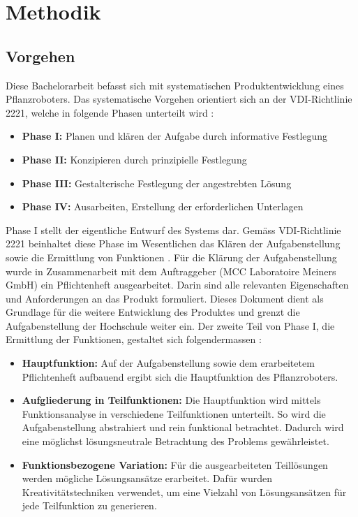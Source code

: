 \newpage
\section{Methodik}
\subsection{Vorgehen}
Diese Bachelorarbeit befasst sich mit systematischen Produktentwicklung eines Pflanzroboters. Das systematische Vorgehen orientiert sich  an der VDI-Richtlinie 2221, welche in folgende Phasen unterteilt wird \cite{naefe}:

\begin{itemize}
	\item \textbf{Phase I:} Planen und klären der Aufgabe durch informative Festlegung
	
	\item \textbf{Phase II:} Konzipieren durch prinzipielle Festlegung
	
	\item \textbf{Phase III:} Gestalterische Festlegung der angestrebten Lösung
	
	\item \textbf{Phase IV:} Ausarbeiten, Erstellung der erforderlichen Unterlagen
	
\end{itemize}

Phase I stellt der eigentliche Entwurf des Systems dar. Gemäss VDI-Richtlinie 2221 beinhaltet diese Phase im Wesentlichen das Klären der Aufgabenstellung sowie die Ermittlung von Funktionen \cite{vdi2221}. Für die Klärung der Aufgabenstellung wurde in Zusammenarbeit mit dem Auftraggeber (MCC Laboratoire Meiners GmbH) ein Pflichtenheft ausgearbeitet. Darin sind alle relevanten Eigenschaften und Anforderungen an das Produkt formuliert. Dieses Dokument dient als Grundlage für die weitere Entwicklung des Produktes und grenzt die Aufgabenstellung der Hochschule weiter ein. Der zweite Teil von Phase I, die Ermittlung der Funktionen, gestaltet sich folgendermassen \cite{pahl}:

\begin{itemize}
	\item \textbf{Hauptfunktion:} Auf der Aufgabenstellung sowie dem erarbeitetem Pflichtenheft aufbauend ergibt sich die Hauptfunktion des Pflanzroboters.
	
	\item \textbf{Aufgliederung in Teilfunktionen:} Die Hauptfunktion wird mittels Funktionsanalyse in verschiedene Teilfunktionen unterteilt. So wird die Aufgabenstellung abstrahiert und rein funktional betrachtet. Dadurch wird eine möglichst lösungsneutrale Betrachtung des Problems gewährleistet. 
	
	\item \textbf{Funktionsbezogene Variation:} Für die ausgearbeiteten Teillösungen werden mögliche Lösungsansätze erarbeitet. Dafür wurden Kreativitätstechniken verwendet, um eine Vielzahl von Lösungsansätzen für jede Teilfunktion zu generieren.

\end{itemize}

